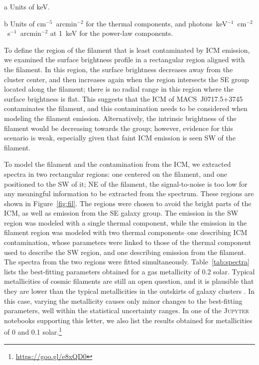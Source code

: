 \begin{table}
\begin{center}
\begin{threeparttable}
\begin{tabular}{l c c}
      \end{tabular}
      \begin{tablenotes}
              \item[a] Units of keV.
              \item[b] Units of cm$^{-5}$~arcmin$^{-2}$ for the thermal components, and photons~keV$^{-1}$~cm$^{-2}$~s$^{-1}$~arcmin$^{-2}$ at 1~keV for the power-law components.
      \end{tablenotes}
    \end{threeparttable}
  \end{center}
\end{table}

To define the region of the filament that is least contaminated by ICM emission, we examined the surface brightness profile in a rectangular region aligned with the filament. In this region, the surface brightness decreases away from the cluster center, and then increases again when the region intersects the SE group located along the filament; there is no radial range in this region where the surface brightness is flat. This suggests that the ICM of MACS~J0717.5+3745 contaminates the filament, and this contamination needs to be considered when modeling the filament emission. Alternatively, the intrinsic brightness of the filament would be decreasing towards the group; however, evidence for this scenario is weak, especially given that faint ICM emission is seen SW of the filament.

To model the filament and the contamination from the ICM, we extracted spectra in two rectangular regions: one centered on the filament, and one positioned to the SW of it; NE of the filament, the signal-to-noise is too low for any meaningful information to be extracted from the spectrum. These regions are shown in Figure~\ref{fig:fil}. The regions were chosen to avoid the bright parts of the ICM, as well as emission from the SE galaxy group. The emission in the SW region was modeled with a single thermal component, while the emission in the filament region was modeled with two thermal components--one describing ICM contamination, whose parameters were linked to those of the thermal component used to describe the SW region, and one describing emission from the filament. The spectra from the two regions were fitted simultaneously. Table~\ref{tab:spectra} lists the best-fitting parameters obtained for a gas metallicity of 0.2 solar. Typical metallicities of cosmic filaments are still an open question, and it is plausible that they are lower than the typical metallicities in the outskirts of galaxy clusters \citet[$\sim 0.2-0.3$; e.g.][]{Simionescu2015}. In this case, varying the metallicity causes only minor changes to the best-fitting parameters, well within the statistical uncertainty ranges. In one of the \textsc{Jupyter} notebooks supporting this letter, we also list the results obtained for metallicities of 0 and 0.1 solar.\footnote{\url{https://goo.gl/e8xQD0}}

